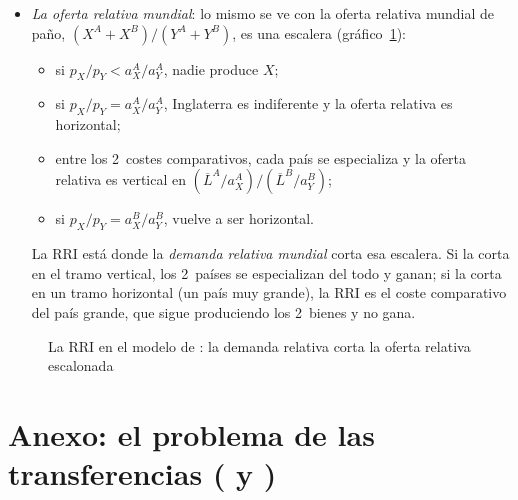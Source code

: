 \documentclass[11pt]{article}
\begin{document}
\begin{itemize}
\item \emph{La oferta relativa mundial}: lo mismo se ve con la oferta relativa mundial de paño, $(X^A+X^B)/(Y^A+Y^B)$, es una escalera (gráfico~\ref{fig:ricardo-oferta-relativa}):
  \begin{itemize}
  \item si $p_X/p_Y<a_X^A/a_Y^A$, nadie produce $X$;
  \item si $p_X/p_Y=a_X^A/a_Y^A$, Inglaterra es indiferente y la oferta relativa es horizontal;
  \item entre los 2~costes comparativos, cada país se especializa y la oferta relativa es vertical en $(\overline L^A/a_X^A)/(\overline L^B/a_Y^B)$;
  \item si $p_X/p_Y=a_X^B/a_Y^B$, vuelve a ser horizontal.
  \end{itemize}
  La RRI está donde la \emph{demanda relativa mundial} corta esa escalera. Si la corta en el tramo vertical, los 2~países se especializan del todo y ganan; si la corta en un tramo horizontal (un país muy grande), la RRI es el coste comparativo del país grande, que sigue produciendo los 2~bienes y no gana.
\end{itemize}
\begin{figure}[H]
\centering
\caption{La RRI en el modelo de : la demanda relativa corta la oferta relativa escalonada}\label{fig:ricardo-oferta-relativa}
\end{figure}
\section{Anexo: el problema de las transferencias ( y )}\label{anexo:transferencias}
\end{document}
